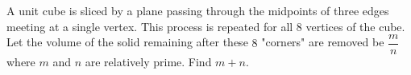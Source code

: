 A unit cube is sliced by a plane passing through the midpoints of three edges meeting at a single vertex. This process is repeated for all $8$ vertices of the cube. Let the volume of the solid remaining after these $8$ "corners" are removed be $\dfrac{m}{n}$ where $m$ and $n$ are relatively prime. Find $m+n$.

